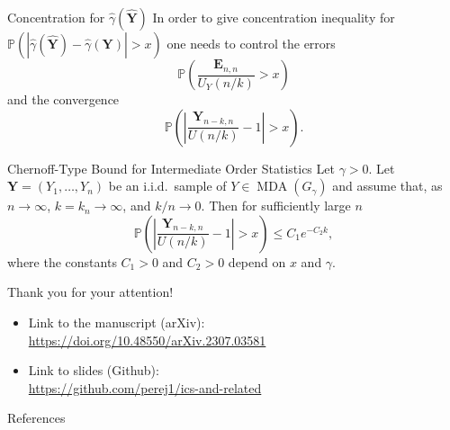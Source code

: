 \documentclass[11pt, aspectratio=169]{beamer}
\DeclareMathOperator{\mda}{MDA}
\begin{document}

\begin{frame}{Concentration for $\hat\gamma(\hat{\bm Y})$} In order to give
  concentration inequality for $\mathbb{P}\left(\left|\hat\gamma(\hat{\bm Y}) -
  \hat\gamma(\bm Y)\right| > x\right)$ one needs to control the errors
  \begin{equation*}
    \mathbb{P}\left(\frac{\bm E_{n,n}}{U_Y\left(n/k\right)} > x\right)
  \end{equation*}
  and the convergence
  \begin{equation*}
    \mathbb{P}\left(\left|\frac{\bm
    Y_{n-k,n}}{U(n/k)} - 1\right| > x\right).
  \end{equation*}
\end{frame}


\begin{frame}{Chernoff-Type Bound for Intermediate Order Statistics}
  Let $\gamma > 0$. Let $\bm Y = \left(Y_1, \ldots, Y_n\right)$ be an i.i.d.\
  sample of $Y\in\mda\left(G_\gamma\right)$ and assume that, as $n\to\infty$,
  $k=k_n\to\infty$, and $k/n\to 0$. Then for sufficiently large $n$
  \begin{equation*}
    \mathbb{P}\left(\left|\frac{\bm
    Y_{n-k,n}}{U(n/k)} - 1\right| > x\right)
    \leq C_1 e^{-C_2 k},
  \end{equation*} 
  where the constants $C_1 > 0$ and $C_2 > 0$ depend on $x$ and $\gamma$.
\end{frame}


\begin{frame}
  Thank you for your attention!
  \begin{itemize}
    \item Link to the manuscript (arXiv): \\
    \textcolor{hyscience}{\url{https://doi.org/10.48550/arXiv.2307.03581}}
    \item Link to slides (Github): \\
    \textcolor{hyscience}{\url{https://github.com/perej1/ics-and-related}}
  \end{itemize}
\end{frame}


\begin{frame}[allowframebreaks]{References}
  \printbibliography
\end{frame}
\end{document}
